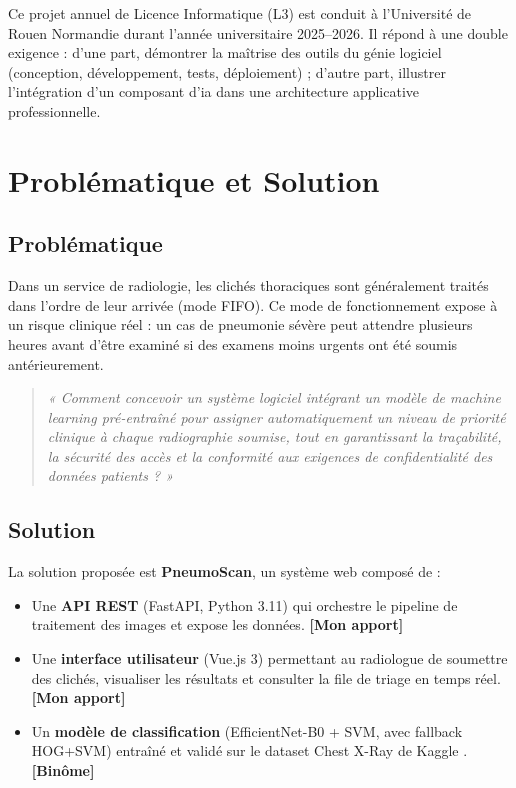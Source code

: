 \documentclass[12pt, a4paper]{report}
\newcommand{\mypart}{\textbf{[Mon apport]}}
\newcommand{\binpart}{\textbf{[Binôme]}}
\begin{document}
Ce projet annuel de Licence Informatique (L3) est conduit à l'Université de Rouen
Normandie durant l'année universitaire 2025--2026. Il répond à une double exigence :
d'une part, démontrer la maîtrise des outils du génie logiciel (conception,
développement, tests, déploiement) ; d'autre part, illustrer l'intégration d'un
composant d'\acrshort{ia} dans une architecture applicative professionnelle.

\section{Problématique et Solution}

\subsection{Problématique}

Dans un service de radiologie, les clichés thoraciques sont généralement traités
dans l'ordre de leur arrivée (mode FIFO). Ce mode de fonctionnement expose à un
risque clinique réel : un cas de pneumonie sévère peut attendre plusieurs heures
avant d'être examiné si des examens moins urgents ont été soumis antérieurement.

\begin{quote}
\itshape
« Comment concevoir un système logiciel intégrant un modèle de machine learning
pré-entraîné pour assigner automatiquement un niveau de priorité clinique
à chaque radiographie soumise, tout en garantissant la traçabilité, la sécurité
des accès et la conformité aux exigences de confidentialité des données patients ? »
\end{quote}

\subsection{Solution}

La solution proposée est \textbf{PneumoScan}, un système web composé de :
\begin{itemize}
  \item Une \textbf{API REST} (FastAPI, Python 3.11) qui orchestre le pipeline
        de traitement des images et expose les données. \mypart
  \item Une \textbf{interface utilisateur} (Vue.js 3) permettant au radiologue
        de soumettre des clichés, visualiser les résultats et consulter la file
        de triage en temps réel. \mypart
    \item Un \textbf{modèle de classification} (EfficientNet-B0 + SVM, avec fallback HOG+SVM)
      entraîné et validé sur le dataset
        Chest X-Ray de Kaggle \cite{mooney2018}. \binpart
\end{itemize}
\end{document}
